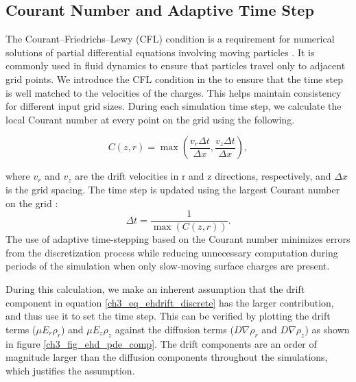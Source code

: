 \subsection{Courant Number and Adaptive Time Step}
\label{ch3_sec_courant}
The Courant–Friedrichs–Lewy (CFL) condition is a requirement for numerical solutions of partial differential equations involving moving particles \cite{cfl_condition}. It is commonly used in fluid dynamics to ensure that particles travel only to adjacent grid points. We introduce the CFL condition in the {\ehd} to ensure that the time step is well matched to the velocities of the charges. This helps maintain consistency for different input grid sizes. During each simulation time step, we calculate the local Courant number at every point on the grid using the following.

\begin{equation}
C(z,r) = \max \left( \frac{v_r \Delta t}{\Delta x}, \frac{v_z \Delta t}{\Delta x} \right),
\end{equation}

\noindent
where \( v_r \) and \( v_z \) are the drift velocities in r and z directions, respectively, and  \( \Delta x \) is the grid spacing. The time step is updated using the largest Courant number on the grid :
\begin{equation}
\Delta t = \frac{1}{\max (C(z,r))}.
\end{equation}
The use of adaptive time-stepping based on the Courant number minimizes errors from the discretization process while reducing unnecessary computation during periods of the simulation when only slow-moving surface charges are present.

During this calculation, we make an inherent assumption that the drift component in equation \ref{ch3_eq_ehdrift_discrete} has the larger contribution, and thus use it to set the time step. This can be verified by plotting the drift terms ($\mu E_r \rho_r$) and $\mu E_z \rho_z$ against the diffusion terms ($D \nabla \rho_r$ and $D \nabla \rho_z$) as shown in figure \ref{ch3_fig_ehd_pde_comp}. The drift components are an order of magnitude larger than the diffusion components throughout the simulations, which justifies the assumption.


